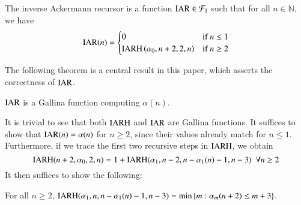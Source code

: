 \begin{defn}  \label{defn: inv_ack_recursor}
The inverse Ackermann recursor is a function $\text{IAR} \in \mathcal{F}_1$ such that for all $n\in \mathbb{N}$, we have
\begin{equation}
\text{IAR}(n) = \begin{cases}
0 & \text{if } n \le 1 \\ \text{IARH}\left(\alpha_0, n + 2, 2, n\right) & \text{if } n\ge 2
\end{cases}
\end{equation}
\end{defn}

The following theorem is a central result in this paper, which asserts the correctness of $\text{IAR}$.

\begin{thm} \label{thm: inv_ack_correct}
$\text{IAR}$ is a Gallina function computing $\alpha(n)$.
\end{thm}

It is trivial to see that both $\text{IARH}$ and $\text{IAR}$ are Gallina functions. It suffices to show that $\text{IAR}(n) = \alpha(n)$ for $n\ge 2$, since their values already match for $n\le 1$. Furthermore, if we trace the first two recursive steps in $\text{IARH}$, we obtain
\begin{equation}
\text{IARH}(n+2, \alpha_0, 2, n) = 1 + \text{IARH}(\alpha_1, n-2, n-\alpha_1(n)-1, n-3) \ \ \forall n\ge 2
\end{equation}
It then suffices to show the following:

\begin{lem}
For all $n\ge 2$, $\text{IARH}(\alpha_1, n, n - \alpha_1(n) - 1, n - 3) = \min\left\{m : \alpha_m(n+2)\le m+3 \right\}$.
\end{lem}